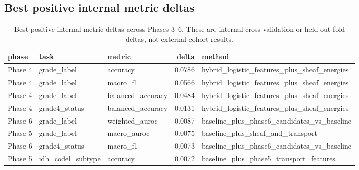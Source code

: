 \documentclass[11pt]{article}
\begin{document}
\subsection{Best positive internal metric deltas}
\begin{table}[H]
\centering
\small
\begin{tabular}{lllrl}
\toprule
phase & task & metric & delta & method \\
\midrule
Phase 4 & grade\_label & accuracy & 0.0786 & hybrid\_logistic\_features\_plus\_sheaf\_energies \\
Phase 4 & grade\_label & macro\_f1 & 0.0566 & hybrid\_logistic\_features\_plus\_sheaf\_energies \\
Phase 4 & grade\_label & balanced\_accuracy & 0.0484 & hybrid\_logistic\_features\_plus\_sheaf\_energies \\
Phase 4 & grade4\_status & balanced\_accuracy & 0.0131 & hybrid\_logistic\_features\_plus\_sheaf\_energies \\
Phase 6 & grade\_label & weighted\_auroc & 0.0087 & baseline\_plus\_phase6\_candidates\_vs\_baseline \\
Phase 5 & grade\_label & macro\_auroc & 0.0075 & baseline\_plus\_sheaf\_and\_transport \\
Phase 6 & grade4\_status & macro\_f1 & 0.0073 & baseline\_plus\_phase6\_candidates\_vs\_baseline \\
Phase 5 & idh\_codel\_subtype & accuracy & 0.0072 & baseline\_plus\_phase5\_transport\_features \\
\bottomrule
\end{tabular}

\caption{Best positive internal metric deltas across Phases 3--6. These are internal cross-validation or held-out-fold deltas, not external-cohort results.}
\end{table}
\end{document}
